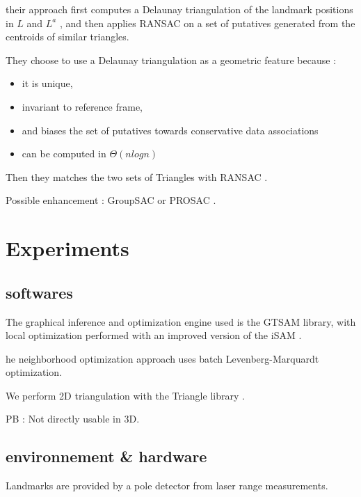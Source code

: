 \documentclass[twoside,twocolumn]{article}
\begin{document}
their approach  first  computes  a  Delaunay  triangulation
of  the  landmark  positions  in
$L$
and
$L^a$
,  and  then  applies
RANSAC on a set of putatives generated from the centroids
of  similar  triangles.

They choose to use a Delaunay triangulation as a geometric
feature  because  :
\begin{itemize}
 \item it  is  unique,
 \item invariant  to  reference  frame,
 \item and  biases  the  set  of  putatives  towards  conservative  data
       associations
 \item can be computed in $\Theta
       (
       n
       log
       n
       )$
\end{itemize}
Then they matches the two sets of Triangles with RANSAC \cite{fischler_random_1981}.

Possible enhancement : GroupSAC \cite{ni_groupsac:_2009} or PROSAC \cite{chum_matching_2005}.

\section{Experiments}
\subsection{softwares}

The  graphical  inference  and  optimization
engine  used  is  the  GTSAM  library,  with  local  optimization
performed  with  an  improved  version  of  the  iSAM \cite{kaess_isam:_2008}.

he  neighborhood  optimization  approach  uses
batch  Levenberg-Marquardt  optimization.

We  perform  2D
triangulation with the Triangle library \cite{shewchuk_triangle:_1996}.

PB : Not directly usable in 3D.

\subsection{environnement & hardware}
Landmarks are provided by a pole detector from laser range measurements.

\printbibliography
\end{document}
